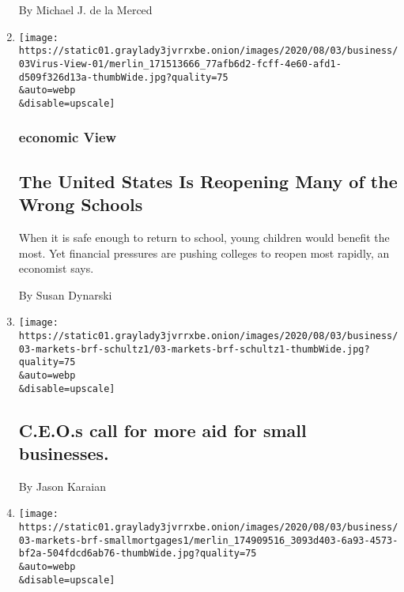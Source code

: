 \begin{enumerate}
  By Michael J. de la Merced
\item
  \href{/2020/08/03/business/how-schools-reopen.html}{}

  \texttt{[image: https://static01.graylady3jvrrxbe.onion/images/2020/08/03/business/03Virus-View-01/merlin\_171513666\_77afb6d2-fcff-4e60-afd1-d509f326d13a-thumbWide.jpg?quality=75\\\&auto=webp\\\&disable=upscale]}

  \hypertarget{economic-view}{%
  \subsubsection{economic View}\label{economic-view}}

  \hypertarget{the-united-states-is-reopening-many-of-the-wrong-schools}{%
  \subsection{The United States Is Reopening Many of the Wrong
  Schools}\label{the-united-states-is-reopening-many-of-the-wrong-schools}}

  When it is safe enough to return to school, young children would
  benefit the most. Yet financial pressures are pushing colleges to
  reopen most rapidly, an economist says.

  By Susan Dynarski
\item
  \href{/2020/08/03/business/ceos-call-for-more-aid-for-small-businesses.html}{}

  \texttt{[image: https://static01.graylady3jvrrxbe.onion/images/2020/08/03/business/03-markets-brf-schultz1/03-markets-brf-schultz1-thumbWide.jpg?quality=75\\\&auto=webp\\\&disable=upscale]}

  \hypertarget{ceos-call-for-more-aid-for-small-businesses}{%
  \subsection{C.E.O.s call for more aid for small
  businesses.}\label{ceos-call-for-more-aid-for-small-businesses}}

  By Jason Karaian
\item
  \href{/2020/08/03/business/a-project-in-kentucky-aims-to-show-how-home-lending-can-build-wealth.html}{}

  \texttt{[image: https://static01.graylady3jvrrxbe.onion/images/2020/08/03/business/03-markets-brf-smallmortgages1/merlin\_174909516\_3093d403-6a93-4573-bf2a-504fdcd6ab76-thumbWide.jpg?quality=75\\\&auto=webp\\\&disable=upscale]}


\end{enumerate}
